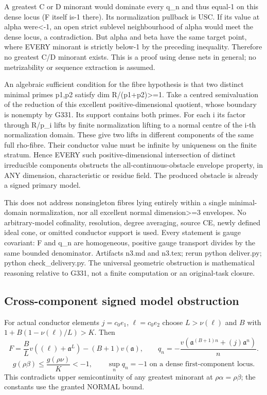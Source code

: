 \documentclass[11pt]{article}
\begin{document}
A greatest C or D minorant would dominate every q\_n and thus equal-1 on this dense locus (F itself is-1 there). Its normalization pullback is USC. If its value at alpha were\textless{}-1, an open strict sublevel neighbourhood of alpha would meet the dense locus, a contradiction. But alpha and beta have the same target point, where EVERY minorant is strictly below-1 by the preceding inequality. Therefore no greatest C/D minorant exists. This is a proof using dense nets in general; no metrizability or sequence extraction is assumed.

An algebraic sufficient condition for the fibre hypothesis is that two distinct minimal primes p1,p2 satisfy dim R/(p1+p2)\textgreater{}=1. Take a centred semivaluation of the reduction of this excellent positive-dimensional quotient, whose boundary is nonempty by G331. Its support contains both primes. For each i its factor through R/p\_i lifts by finite normalization lifting to a normal centre of the i-th normalization domain. These give two lifts in different components of the same full rho-fibre. Their conductor value must be infinite by uniqueness on the finite stratum. Hence EVERY such positive-dimensional intersection of distinct irreducible components obstructs the all-continuous-obstacle envelope property, in ANY dimension, characteristic or residue field. The produced obstacle is already a signed primary model.

This does not address nonsingleton fibres lying entirely within a single minimal-domain normalization, nor all excellent normal dimension\textgreater{}=3 envelopes. No arbitrary-model cofinality, resolution, degree averaging, source CE, newly defined ideal cone, or omitted conductor support is used. Every statement is gauge covariant: F and q\_n are homogeneous, positive gauge transport divides by the same bounded denominator. Artifacts n3.md and n3.tex; rerun python deliver.py; python check\_delivery.py. The universal geometric obstruction is mathematical reasoning relative to G331, not a finite computation or an original-task closure.

\subsection*{Cross-component signed model obstruction}
For actual conductor elements $j=c_0e_1$, $\ell=c_0e_2$ choose
$L>\nu(\ell)$ and $B$ with $1+B(1-\nu(\ell)/L)>K$. Then
\[
 F=\frac BLv((\ell)+\mathfrak a^L)-(B+1)v(\mathfrak a),\qquad
 q_n=-\frac{v(\mathfrak a^{(B+1)n}+(j)\mathfrak a^n)}n.
\]
\[
 g(\rho\beta)\le\frac{g(\rho\nu)}K<-1,\qquad
 \sup_n q_n=-1\text{ on a dense first-component locus}.
\]
This contradicts upper semicontinuity of any greatest minorant at
$\rho\alpha=\rho\beta$; the constants use the granted NORMAL bound.
\end{document}
